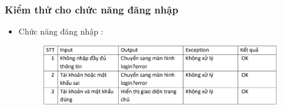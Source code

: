 \documentclass{article}
\begin{document}
\subsubsection{Kiểm thử cho chức năng đăng nhập}
\begin{itemize}
    \item Chức năng đăng nhập :
    \begin{figure}[H]
        \centering
    \includegraphics[width=1\textwidth]{Kiểm thử/Kiểm thử đăng nhập.png}
    \end{figure}
\end{itemize}
\end{document}
